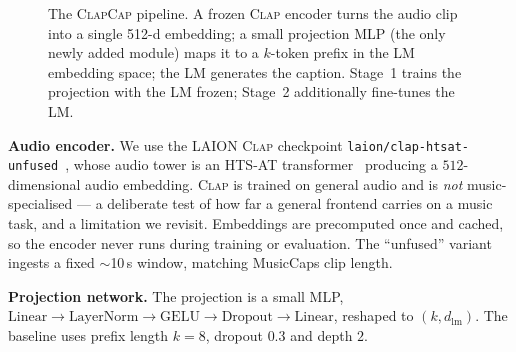 \documentclass{article}
\newcommand{\clapenc}{\textsc{Clap}}
\newcommand{\sys}{\textsc{ClapCap}}
\begin{document}
\begin{figure}[t]\centering
\footnotesize
{}
\caption{The \sys{} pipeline. A frozen \clapenc{} encoder turns the audio clip into a single
512-d embedding; a small projection MLP (the only newly added module) maps it to a $k$-token
prefix in the LM embedding space; the LM generates the caption. Stage~1 trains the projection
with the LM frozen; Stage~2 additionally fine-tunes the LM.}
\label{fig:pipeline}
\end{figure}

\textbf{Audio encoder.}
We use the LAION \clapenc{} checkpoint \texttt{laion/clap-htsat-unfused}~\cite{wu2023clap},
whose audio tower is an HTS-AT transformer~\cite{chen2022htsat} producing a $512$-dimensional
audio embedding. \clapenc{} is trained on general audio and is \emph{not}
music-specialised --- a deliberate test of how far a general frontend carries on a music task,
and a limitation we revisit. Embeddings are precomputed once and cached, so the encoder never
runs during training or evaluation. The ``unfused'' variant ingests a fixed $\sim$10\,s window,
matching MusicCaps clip length.

\textbf{Projection network.}
The projection is a small MLP,
$\text{Linear}\!\rightarrow\!\text{LayerNorm}\!\rightarrow\!\text{GELU}\!\rightarrow\!
\text{Dropout}\!\rightarrow\!\text{Linear}$, reshaped to $(k,d_{\text{lm}})$. The baseline uses
prefix length $k{=}8$, dropout $0.3$ and depth $2$.
\end{document}
